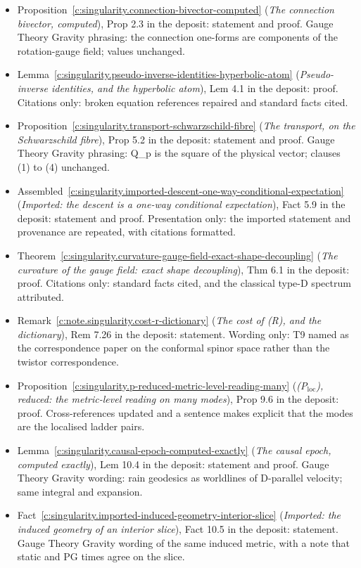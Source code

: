 \documentclass[11pt]{article}
\theoremstyle{definition}
\theoremstyle{plain}
\begin{document}
\begin{itemize}\setlength{\itemsep}{2pt}
\item Proposition~\ref{c:singularity.connection-bivector-computed} (\emph{The connection bivector, computed}), Prop 2.3 in the deposit: statement and proof. Gauge Theory Gravity phrasing: the connection one-forms are components of the rotation-gauge field; values unchanged.
\item Lemma~\ref{c:singularity.pseudo-inverse-identities-hyperbolic-atom} (\emph{Pseudo-inverse identities, and the hyperbolic atom}), Lem 4.1 in the deposit: proof. Citations only: broken equation references repaired and standard facts cited.
\item Proposition~\ref{c:singularity.transport-schwarzschild-fibre} (\emph{The transport, on the Schwarzschild fibre}), Prop 5.2 in the deposit: statement and proof. Gauge Theory Gravity phrasing: Q\_p is the square of the physical vector; clauses (1) to (4) unchanged.
\item Assembled~\ref{c:singularity.imported-descent-one-way-conditional-expectation} (\emph{Imported: the descent is a one-way conditional expectation}), Fact 5.9 in the deposit: statement and proof. Presentation only: the imported statement and provenance are repeated, with citations formatted.
\item Theorem~\ref{c:singularity.curvature-gauge-field-exact-shape-decoupling} (\emph{The curvature of the gauge field: exact shape decoupling}), Thm 6.1 in the deposit: proof. Citations only: standard facts cited, and the classical type-D spectrum attributed.
\item Remark~\ref{c:note.singularity.cost-r-dictionary} (\emph{The cost of (R), and the dictionary}), Rem 7.26 in the deposit: statement. Wording only: T9 named as the correspondence paper on the conformal spinor space rather than the twistor correspondence.
\item Proposition~\ref{c:singularity.p-reduced-metric-level-reading-many} (\emph{(P$_{\mathrm{loc}}$), reduced: the metric-level reading on many modes}), Prop 9.6 in the deposit: proof. Cross-references updated and a sentence makes explicit that the modes are the localised ladder pairs.
\item Lemma~\ref{c:singularity.causal-epoch-computed-exactly} (\emph{The causal epoch, computed exactly}), Lem 10.4 in the deposit: statement and proof. Gauge Theory Gravity wording: rain geodesics as worldlines of D-parallel velocity; same integral and expansion.
\item Fact~\ref{c:singularity.imported-induced-geometry-interior-slice} (\emph{Imported: the induced geometry of an interior slice}), Fact 10.5 in the deposit: statement. Gauge Theory Gravity wording of the same induced metric, with a note that static and PG times agree on the slice.

\end{itemize}
\end{document}
